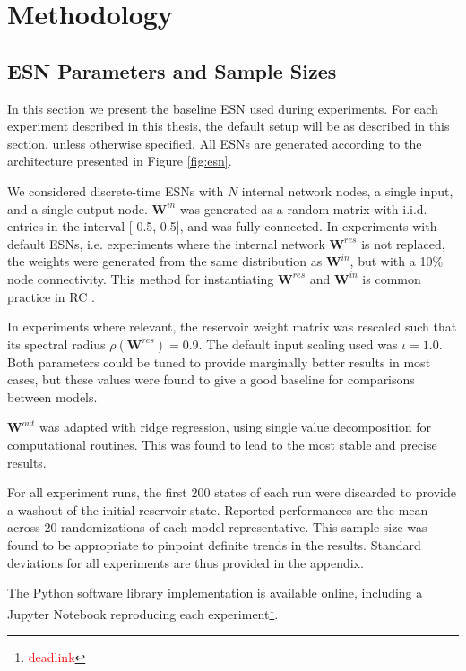 \chapter{Methodology}

\section{ESN Parameters and Sample Sizes}

In this section we present the baseline ESN used during experiments. For each
experiment described in this thesis, the default setup will be as described in
this section, unless otherwise specified. All ESNs are generated according to
the architecture presented in Figure \ref{fig:esn}.

We considered discrete-time ESNs with $N$ internal network nodes, a single
input, and a single output node. $\mathbf{W}^{in}$ was generated as a random
matrix with i.i.d. entries in the interval [-0.5, 0.5], and was fully
connected. In experiments with default ESNs, i.e. experiments where the internal
network $\mathbf{W}^{res}$ is not replaced, the weights were generated from the
same distribution as $\mathbf{W}^{in}$, but with a 10\% node connectivity. This
method for instantiating $\mathbf{W}^{res}$ and $\mathbf{W}^{in}$ is common
practice in RC \cite{montavon_practical_2012}.

In experiments where relevant, the reservoir weight matrix was rescaled such
that its spectral radius $\rho(\mathbf{W}^{res}) = 0.9$. The default input
scaling used was $\iota = 1.0$. Both parameters could be tuned to provide
marginally better results in most cases, but these values were found to give a
good baseline for comparisons between models.

$\mathbf{W}^{out}$ was adapted with ridge regression, using single value
decomposition for computational routines. This was found to lead to the most
stable and precise results.

For all experiment runs, the first 200 states of each run were discarded to
provide a washout of the initial reservoir state. Reported performances are the
mean across 20 randomizations of each model representative. This sample size was
found to be appropriate to pinpoint definite trends in the results. Standard
deviations for all experiments are thus provided in the appendix.

The Python software library implementation is available online, including a
Jupyter Notebook reproducing each
experiment\footnote{\textcolor{red}{deadlink}}.

